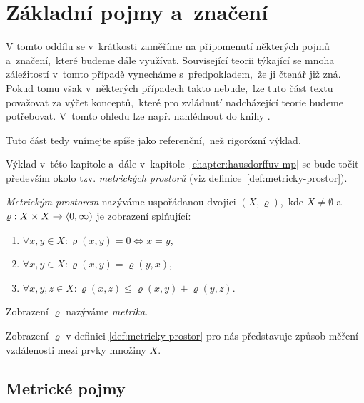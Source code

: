 \section{Základní pojmy a~značení}\label{sec:zakladni-pojmy-a-znaceni}

V tomto oddílu se v~krátkosti zaměříme na připomenutí některých pojmů a~značení,~které budeme dále využívat. Související teorii týkající se mnoha záležitostí v~tomto případě vynecháme s~předpokladem,~že ji čtenář již zná. Pokud tomu však v~některých případech takto nebude,~lze tuto část textu považovat za výčet konceptů,~které pro zvládnutí nadcházející teorie budeme potřebovat. V~tomto ohledu lze např. nahlédnout do knihy \cite{NetukaAnalyza2014}.

Tuto část tedy vnímejte spíše jako referenční,~než rigorózní výklad.

Výklad v~této kapitole a~dále v~kapitole~\ref{chapter:hausdorffuv-mp} se bude točit především okolo tzv. \emph{metrických prostorů} (viz definice~\ref{def:metricky-prostor}).
\begin{definition}\label{def:metricky-prostor}
    \emph{Metrickým prostorem} nazýváme uspořádanou dvojici $(X,\varrho)$,~kde $X\neq\emptyset$ a~$\varrho:X\times X \rightarrow \langle0,\infty)$ je zobrazení splňující:
    \begin{enumerate}[label=(\alph*)]
        \item $\forall x,y\in X: \varrho(x,y)=0\iff x=y$,
        \item $\forall x,y\in X: \varrho(x,y)=\varrho(y,x)$,
        \item $\forall x,y,z\in X: \varrho(x,z)\leqslant\varrho(x,y)+\varrho(y,z)$.
    \end{enumerate}
    Zobrazení $\varrho$ nazýváme \emph{metrika}.
\end{definition}
Zobrazení $\varrho$ v definici \ref{def:metricky-prostor} pro nás představuje způsob měření vzdálenosti mezi prvky množiny $X$. 

\subsection{Metrické pojmy}\label{subsec:metricke-pojmy}

